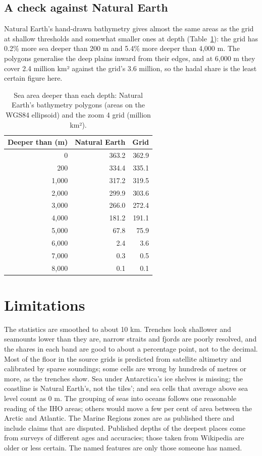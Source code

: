 \documentclass[11pt,a4paper]{article}
\begin{document}
\subsection{A check against Natural Earth}
Natural Earth's hand-drawn bathymetry gives almost the same areas as the grid at shallow thresholds and somewhat smaller ones at depth (Table~\ref{tab:ne}): the grid has 0.2\% more sea deeper than 200 m and 5.4\% more deeper than 4,000 m. The polygons generalise the deep plains inward from their edges, and at 6,000 m they cover 2.4 million km² against the grid's 3.6 million, so the hadal share is the least certain figure here.

\begin{table}[tbp]\centering\small\caption{Sea area deeper than each depth: Natural Earth's bathymetry polygons (areas on the WGS84 ellipsoid) and the zoom 4 grid (million km²).}\label{tab:ne}\begin{tabular}{rrr}\toprule Deeper than (m) & Natural Earth & Grid\\\midrule
0 & 363.2 & 362.9\\
200 & 334.4 & 335.1\\
1,000 & 317.2 & 319.5\\
2,000 & 299.9 & 303.6\\
3,000 & 266.0 & 272.4\\
4,000 & 181.2 & 191.1\\
5,000 & 67.8 & 75.9\\
6,000 & 2.4 & 3.6\\
7,000 & 0.3 & 0.5\\
8,000 & 0.1 & 0.1\\
\bottomrule\end{tabular}\end{table}

\section{Limitations}
The statistics are smoothed to about 10 km. Trenches look shallower and seamounts lower than they are, narrow straits and fjords are poorly resolved, and the shares in each band are good to about a percentage point, not to the decimal. Most of the floor in the source grids is predicted from satellite altimetry and calibrated by sparse soundings; some cells are wrong by hundreds of metres or more, as the trenches show. Sea under Antarctica's ice shelves is missing; the coastline is Natural Earth's, not the tiles'; and sea cells that average above sea level count as 0 m. The grouping of seas into oceans follows one reasonable reading of the IHO areas; others would move a few per cent of area between the Arctic and Atlantic. The Marine Regions zones are as published there and include claims that are disputed. Published depths of the deepest places come from surveys of different ages and accuracies; those taken from Wikipedia are older or less certain. The named features are only those someone has named.
\end{document}
